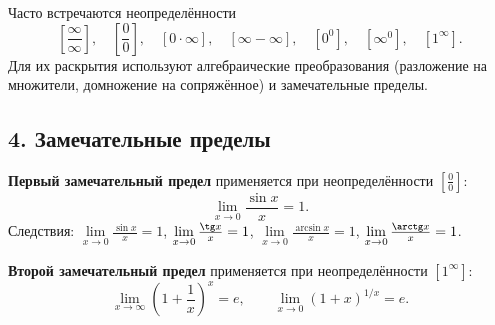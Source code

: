 Часто встречаются неопределённости
\[
  \left[\frac\infty\infty\right],\quad \left[\frac00\right],\quad [0\cdot\infty],\quad [\infty-\infty],\quad [0^0],\quad [\infty^0],\quad [1^\infty].
\]
Для их раскрытия используют алгебраические преобразования (разложение на множители, домножение на сопряжённое) и замечательные пределы.

\subsection*{4. Замечательные пределы}
\begin{exercise}
\textbf{Первый замечательный предел} применяется при неопределённости $\left[\frac00\right]$:
\[
  \lim\limits_{x\to0}\frac{\sin x}{x}=1.
\]
Следствия: $\lim\limits_{x\to0}\frac{\sin x}{x}=1$, $\lim\limits_{x\to0}\frac{\tg x}{x}=1$, $\lim\limits_{x\to0}\frac{\arcsin x}{x}=1$, $\lim\limits_{x\to0}\frac{\arctg x}{x}=1$.
\end{exercise}

\begin{exercise}
\textbf{Второй замечательный предел} применяется при неопределённости $[1^\infty]$:
\[
  \lim\limits_{x\to\infty}\left(1+\frac1x\right)^x=e,
  \qquad
  \lim\limits_{x\to0}(1+x)^{1/x}=e.
\]
\end{exercise}
